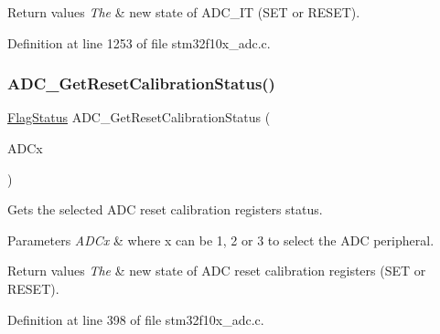 \begin{DoxyRetVals}{Return values}
{\em The} & new state of A\+D\+C\+\_\+\+IT (S\+ET or R\+E\+S\+ET). \\
\hline
\end{DoxyRetVals}


Definition at line 1253 of file stm32f10x\+\_\+adc.\+c.

\mbox{\label{group___a_d_c___private___functions_ga113be9fe25add8d7496bed659c68e02b}} 
\subsubsection{\texorpdfstring{A\+D\+C\+\_\+\+Get\+Reset\+Calibration\+Status()}{ADC\_GetResetCalibrationStatus()}}
{\footnotesize\ttfamily \hyperlink{group___exported__types_ga89136caac2e14c55151f527ac02daaff}{Flag\+Status} A\+D\+C\+\_\+\+Get\+Reset\+Calibration\+Status (\begin{DoxyParamCaption}\item[{\hyperlink{struct_a_d_c___type_def}{A\+D\+C\+\_\+\+Type\+Def} $\ast$}]{A\+D\+Cx }\end{DoxyParamCaption})}



Gets the selected A\+DC reset calibration registers status. 


\begin{DoxyParams}{Parameters}
{\em A\+D\+Cx} & where x can be 1, 2 or 3 to select the A\+DC peripheral. \\
\hline
\end{DoxyParams}

\begin{DoxyRetVals}{Return values}
{\em The} & new state of A\+DC reset calibration registers (S\+ET or R\+E\+S\+ET). \\
\hline
\end{DoxyRetVals}


Definition at line 398 of file stm32f10x\+\_\+adc.\+c.

\mbox{\label{group___a_d_c___private___functions_gaf1119583782ecbcec380efcb7eb74883}} 
